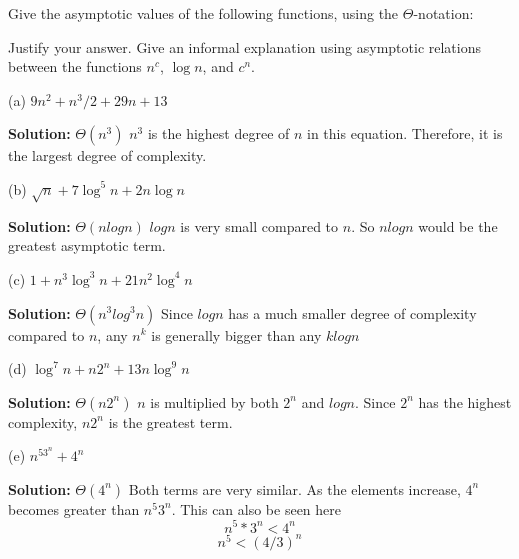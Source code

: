 
\begin{problem}
Give the asymptotic values of the
following functions, using the $\Theta$-notation:

Justify your answer.
Give an informal explanation using asymptotic
relations between the functions $n^c$, $\log n$, and $c^n$.

(a) $9n^2 + n^3/2 + 29n + 13$

\newline
\textbf{Solution:} $\Theta (n^3)$
\newline\newline
$n^3$ is the highest degree of $n$ in this equation. Therefore, it is the largest degree of complexity.

(b) $\sqrt{n}+ 7\log^5 n + 2n\log n$

\newline
\textbf{Solution:} $\Theta (nlogn)$
\newline\newline
$logn$ is very small compared to $n$. So $nlogn$ would be the greatest asymptotic term.

(c) $1+ n^3\log^3n + 21 n^2\log^4n$

\newline
\textbf{Solution:} $\Theta (n^3log^3n)$
\newline\newline
Since $logn$ has a much smaller degree of complexity compared to $n$, any $n^k$ is generally bigger than any $klogn$

(d) $\log^7n + n 2^n + 13n\log^9n$

\newline
\textbf{Solution:} $\Theta (n2^n)$
\newline\newline
$n$ is multiplied by both $2^n$ and $logn$. Since $2^n$ has the highest complexity, $n2^n$ is the greatest term.

(e) {$n^53^n+4^n$}

\newline
\textbf{Solution:} $\Theta (4^n)$
\newline\newline
Both terms are very similar. As the elements increase, $4^n$ becomes greater than $n^5 3^n$. This can also be seen here
\[ n^5 * 3^n  <  4^n \]
\[ n^5 < (4/3)^n \]

\end{problem}


